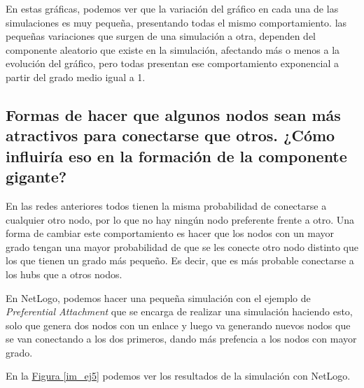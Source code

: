 \documentclass[paper=a4, fontsize=11pt]{article} %
\numberwithin{equation}{section} %
\numberwithin{figure}{section} %
\numberwithin{table}{section} %
\begin{document}
En estas gráficas, podemos ver que la variación del gráfico en cada una de las simulaciones es muy pequeña, presentando todas el mismo comportamiento. las pequeñas variaciones que surgen de una simulación a otra, dependen del componente aleatorio que existe en la simulación, afectando más o menos a la evolución del gráfico, pero todas presentan ese comportamiento exponencial a partir del grado medio igual a 1.

\subsection{Formas de hacer que algunos nodos sean más atractivos para conectarse que otros. ¿Cómo influiría eso en la formación de la componente gigante?}

En las redes anteriores todos tienen la misma probabilidad de conectarse a cualquier otro nodo, por lo que no hay ningún nodo preferente frente a otro. Una forma de cambiar este comportamiento es hacer que los nodos con un mayor grado tengan una mayor probabilidad de que se les conecte otro nodo distinto que los que tienen un grado más pequeño. Es decir, que es más probable conectarse a los hubs que a otros nodos.

En NetLogo, podemos hacer una pequeña simulación con el ejemplo de \textit{Preferential Attachment} que se encarga de realizar una simulación haciendo esto, solo que genera dos nodos con un enlace y luego va generando nuevos nodos que se van conectando a los dos primeros, dando más prefencia a los nodos con mayor grado.

En la \hyperref[im_ej5]{Figura \ref{im_ej5}} podemos ver los resultados de la simulación con NetLogo.
\end{document}
